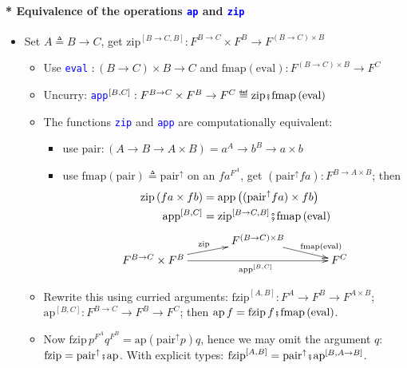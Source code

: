 \paragraph{{*} Equivalence of the operations \texttt{\textcolor{blue}{\footnotesize{}ap}}
and \texttt{\textcolor{blue}{\footnotesize{}zip}} }
\begin{itemize}
\item \vspace{-0.2cm}Set $A\triangleq B\rightarrow C$, get $\text{zip}^{[B\rightarrow C,B]}:F^{B\rightarrow C}\times F^{B}\rightarrow F^{(B\rightarrow C)\times B}$
\begin{itemize}
\item Use \texttt{\textcolor{blue}{\footnotesize{}eval}} $:\left(B\rightarrow C\right)\times B\rightarrow C$
and $\text{fmap}\left(\text{eval}\right):F^{(B\rightarrow C)\times B}\rightarrow F^{C}$
\item Uncurry: \texttt{\textcolor{blue}{\footnotesize{}app}}$\text{}^{[B,C]}:F^{B\rightarrow C}\times F^{B}\rightarrow F^{C}\triangleq\text{zip}\bef\text{fmap}\left(\text{eval}\right)$ 
\item The functions \texttt{\textcolor{blue}{\footnotesize{}zip}} and \texttt{\textcolor{blue}{\footnotesize{}app}}
are computationally equivalent:
\begin{itemize}
\item use $\text{pair}:\left(A\rightarrow B\rightarrow A\times B\right)=a^{A}\rightarrow b^{B}\rightarrow a\times b$
\item use $\text{fmap}\left(\text{pair}\right)\triangleq\text{pair}^{\uparrow}$
on an $fa^{F^{A}}$, get $(\text{pair}^{\uparrow}fa):F^{B\rightarrow A\times B}$;
then{\footnotesize{}
\begin{align*}
\text{zip}\left(fa\times fb\right) & =\text{app}\left((\text{pair}^{\uparrow}fa)\times fb\right)\\
\text{app}^{[B,C]} & =\text{zip}^{[B\rightarrow C,B]}\bef\text{fmap}\left(\text{eval}\right)
\end{align*}
}
\[
\xymatrix{\xyScaleY{0.2pc}\xyScaleX{3pc} & F^{(B\rightarrow C)\times B}\ar[rd]\sp(0.65){\ \ \text{fmap}\left(\text{eval}\right)}\\
F^{B\rightarrow C}\times F^{B}\ar[ru]\sp(0.5){\text{zip}}\ar[rr]\sb(0.55){\text{app}^{[B,C]}} &  & F^{C}
}
\]
\end{itemize}
\item Rewrite this using curried arguments: $\text{fzip}^{[A,B]}:F^{A}\rightarrow F^{B}\rightarrow F^{A\times B}$;
$\text{ap}^{[B,C]}:F^{B\rightarrow C}\rightarrow F^{B}\rightarrow F^{C}$;
then $\text{ap}\,f=\text{fzip}\,f\bef\text{fmap}\left(\text{eval}\right)$. 
\item Now $\text{fzip}\,p^{F^{A}}q^{F^{B}}=\text{ap}\left(\text{pair}^{\uparrow}p\right)q$,
hence we may omit the argument $q$: $\text{fzip}=\text{pair}^{\uparrow}\bef\text{ap}$.
With explicit types: $\text{fzip}^{[A,B]}=\text{pair}^{\uparrow}\bef\text{ap}^{[B,A\rightarrow B]}$.
\end{itemize}
\end{itemize}


